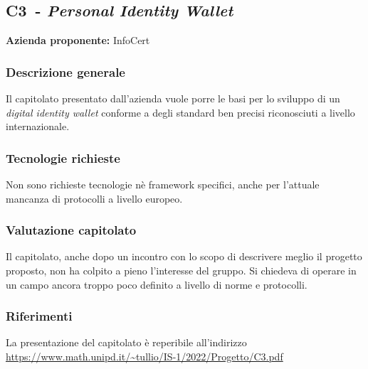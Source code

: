 
\renewcommand{\capName}{\textit{Personal Identity Wallet}} %
\renewcommand{\capCode}{C3} %
\renewcommand{\capLink}{https://www.math.unipd.it/~tullio/IS-1/2022/Progetto/C3.pdf} %
\renewcommand{\capProposer}{InfoCert} %


\subsection{\capCode\ - \capName}
\textbf{Azienda proponente:} InfoCert
\subsubsection{Descrizione generale}
Il capitolato presentato dall'azienda vuole porre le basi per lo sviluppo di un \textit{digital identity wallet} conforme a degli standard ben precisi riconosciuti a livello internazionale.

\subsubsection{Tecnologie richieste}
Non sono richieste tecnologie nè framework specifici, anche per l'attuale mancanza di protocolli a livello europeo.

\subsubsection{Valutazione capitolato}
Il capitolato, anche dopo un incontro con lo scopo di descrivere meglio il progetto proposto, non ha colpito a pieno l'interesse del gruppo. Si chiedeva di operare in un campo ancora troppo poco definito a livello di norme e protocolli.

\subsubsection{Riferimenti}
La presentazione del capitolato è reperibile all'indirizzo \url{\capLink} \hfill{}